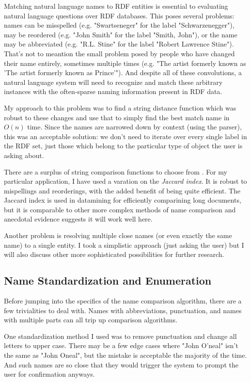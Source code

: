 \documentclass[11pt]{article}
\begin{document}
Matching natural language names to RDF entities is essential to evaluating
natural language questions over RDF databases. This poses several problems:
names can be misspelled (e.g. "Swartseneger" for the label "Schwarzenegger"), 
may be reordered (e.g. "John Smith" for the label "Smith, John"),
or the name may be abbreviated (e.g. "R.L. Stine" for the label "Robert Lawrence Stine").
That's not to meantion the small problem posed by people who have
changed their name entirely, sometimes multiple times
(e.g. "The artist formerly known as 'The artist formerly known as Prince'").
And despite all of these convolutions, a natural language system will need to
recognize and match these arbitrary instances with the often-sparse naming information
present in RDF data.

My approach to this problem was to find a string distance function which was
robust to these changes and use that to simply
find the best match name in $O(n)$ time. Since the names are narrowed down by
context (using the parser), this was an acceptable solution: we don't need to iterate
over every single label in the RDF set, just those which belong to the particular
type of object the user is asking about.

There are a surplus of string comparison functions to choose from \cite{comparison}.
For my particular application, I have used a varation on the {\em Jaccard index}.
It is robust to mispellings and reorderings, with the added benefit of being quite efficient.
The Jaccard index is used in datamining for efficiently comparining long documents,
but it is comparable to other more complex methods of name comparison \cite{comparison} and 
anecdotal evidence suggests it will work well here.

Another problem is resolving multiple close names (or even exactly the same name) to a single entity.
I took a simplistic approach (just asking the user) but I will also discuss other more
sophisticated possibilities for further research. 

\subsection{Name Standardization and Enumeration}
Before jumping into the specifics of the name comparison algorithm, there are a few trivialities
to deal with. Names with abbreviations, punctuation, and names with multiple parts can all
trip up comparison algorithms.

One standardization method I used was to remove punctuation and change all letters to upper case.
There may be a few edge cases where "John O'neal" isn't the same as "John Oneal",
but the mistake is acceptable the majority of the time. And such names are so close that they would
trigger the system to prompt the user for confirmation anyways.
\end{document}
